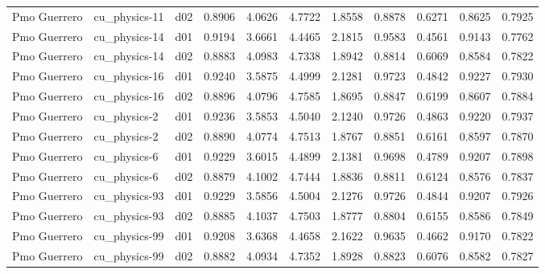 \begin{longtable}{lllrrrrrrrr}
         Pmo Guerrero  &         cu\_physics-11 &     d02 &   0.8906 &   4.0626 &   4.7722 &       1.8558 &        0.8878 &       0.6271 &           0.8625 &  0.7925 \\
         Pmo Guerrero  &         cu\_physics-14 &     d01 &   0.9194 &   3.6661 &   4.4465 &       2.1815 &        0.9583 &       0.4561 &           0.9143 &  0.7762 \\
         Pmo Guerrero  &         cu\_physics-14 &     d02 &   0.8883 &   4.0983 &   4.7338 &       1.8942 &        0.8814 &       0.6069 &           0.8584 &  0.7822 \\
         Pmo Guerrero  &         cu\_physics-16 &     d01 &   0.9240 &   3.5875 &   4.4999 &       2.1281 &        0.9723 &       0.4842 &           0.9227 &  0.7930 \\
         Pmo Guerrero  &         cu\_physics-16 &     d02 &   0.8896 &   4.0796 &   4.7585 &       1.8695 &        0.8847 &       0.6199 &           0.8607 &  0.7884 \\
         Pmo Guerrero  &          cu\_physics-2 &     d01 &   0.9236 &   3.5853 &   4.5040 &       2.1240 &        0.9726 &       0.4863 &           0.9220 &  0.7937 \\
         Pmo Guerrero  &          cu\_physics-2 &     d02 &   0.8890 &   4.0774 &   4.7513 &       1.8767 &        0.8851 &       0.6161 &           0.8597 &  0.7870 \\
         Pmo Guerrero  &          cu\_physics-6 &     d01 &   0.9229 &   3.6015 &   4.4899 &       2.1381 &        0.9698 &       0.4789 &           0.9207 &  0.7898 \\
         Pmo Guerrero  &          cu\_physics-6 &     d02 &   0.8879 &   4.1002 &   4.7444 &       1.8836 &        0.8811 &       0.6124 &           0.8576 &  0.7837 \\
         Pmo Guerrero  &         cu\_physics-93 &     d01 &   0.9229 &   3.5856 &   4.5004 &       2.1276 &        0.9726 &       0.4844 &           0.9207 &  0.7926 \\
         Pmo Guerrero  &         cu\_physics-93 &     d02 &   0.8885 &   4.1037 &   4.7503 &       1.8777 &        0.8804 &       0.6155 &           0.8586 &  0.7849 \\
         Pmo Guerrero  &         cu\_physics-99 &     d01 &   0.9208 &   3.6368 &   4.4658 &       2.1622 &        0.9635 &       0.4662 &           0.9170 &  0.7822 \\
         Pmo Guerrero  &         cu\_physics-99 &     d02 &   0.8882 &   4.0934 &   4.7352 &       1.8928 &        0.8823 &       0.6076 &           0.8582 &  0.7827 \\

\end{longtable}
